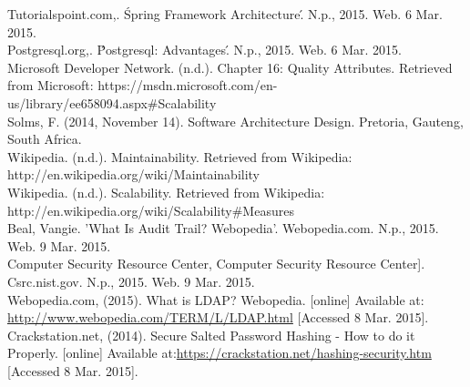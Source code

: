 Tutorialspoint.com,. \'Spring Framework Architecture\'. N.p., 2015. Web. 6 Mar. 2015. \\

Postgresql.org,. \'Postgresql: Advantages\'. N.p., 2015. Web. 6 Mar. 2015.\\

Microsoft Developer Network. (n.d.). Chapter 16: Quality Attributes. Retrieved from Microsoft: https://msdn.microsoft.com/en-us/library/ee658094.aspx#Scalability\\

Solms, F. (2014, November 14). Software Architecture Design. Pretoria, Gauteng, South Africa.\\

Wikipedia. (n.d.). Maintainability. Retrieved from Wikipedia: http://en.wikipedia.org/wiki/Maintainability\\

Wikipedia. (n.d.). Scalability. Retrieved from Wikipedia: http://en.wikipedia.org/wiki/Scalability#Measures\\

Beal, Vangie. 'What Is Audit Trail? Webopedia'. Webopedia.com. N.p., 2015. Web. 9 Mar. 2015.\\

Computer Security Resource Center, Computer Security Resource Center]. Csrc.nist.gov. N.p., 2015. Web. 9 Mar. 2015.\\

Webopedia.com, (2015). What is LDAP? Webopedia. [online] Available at: \url{http://www.webopedia.com/TERM/L/LDAP.html} [Accessed 8 Mar. 2015].\\

Crackstation.net, (2014). Secure Salted Password Hashing - How to do it Properly. [online] Available at:\url{https://crackstation.net/hashing-security.htm} [Accessed 8 Mar. 2015].\\
